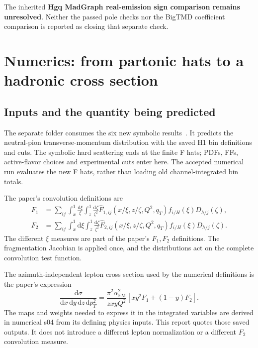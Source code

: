 \documentclass[11pt,a4paper]{article}
\newcommand{\dd}{\mathrm{d}}
\newcommand{\Fhat}{\widehat F}
\begin{document}
The inherited \textbf{Hgq MadGraph real-emission sign comparison remains
unresolved}. Neither the passed pole checks nor the BigTMD coefficient
comparison is reported as closing that separate check.

\section{Numerics: from partonic hats to a hadronic cross section}
\label{sec:numerics}

\subsection{Inputs and the quantity being predicted}

The separate  folder consumes the six new symbolic
results~\cite{localnumerics}. It predicts the neutral-pion transverse-momentum distribution
with the saved H1 bin definitions and cuts. The symbolic hard scattering
ends at the finite F hats; PDFs, FFs, active-flavor choices and
experimental cuts enter here. The accepted numerical run evaluates the
new F hats, rather than loading old channel-integrated bin totals.

The paper's convolution definitions are
\begin{align}
 F_1&=\sum_{ij}\int_x^1\frac{\dd\xi}{\xi}
                    \int_z^1\frac{\dd\zeta}{\zeta^2}
       \Fhat_{1,ij}(x/\xi,z/\zeta,Q^2,q_T)
       f_{i/H}(\xi)D_{h/j}(\zeta),\\
 F_2&=\sum_{ij}\int_x^1\dd\xi
                    \int_z^1\frac{\dd\zeta}{\zeta^2}
       \Fhat_{2,ij}(x/\xi,z/\zeta,Q^2,q_T)
       f_{i/H}(\xi)D_{h/j}(\zeta).
\end{align}
The different $\xi$ measures are part of the paper's $F_1,F_2$
definitions. The fragmentation Jacobian is applied once, and the
distributions act on the complete convolution test function.

The azimuth-independent lepton cross section used by the numerical
definitions is the paper's expression
\begin{equation}
 \frac{\dd\sigma}{\dd x\,\dd y\,\dd z\,\dd p_T^2}
 =\frac{\pi^2\alpha_{\mathrm{EM}}^2}{zxyQ^2}
 \left[xy^2F_1+(1-y)F_2\right].
 \label{eq:leptonxs}
\end{equation}
The maps and weights needed to express it in the integrated variables
are derived in numerical s04 from its defining physics inputs. This
report quotes those saved outputs. It does not introduce a different
lepton normalization or a different $F_2$ convolution measure.
\end{document}

